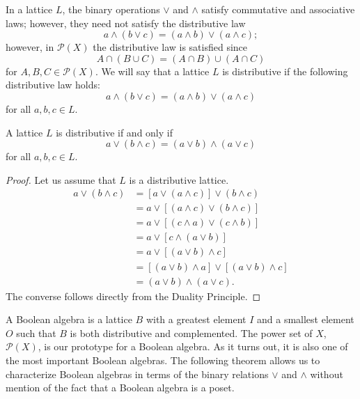  
In a lattice $L$, the binary operations $\vee$ and $\wedge$ satisfy
commutative and associative laws; however, they need not satisfy the
distributive law 
\[ 
a \wedge ( b \vee c ) = (a \wedge b ) \vee ( a \wedge c );
\] 
however, in ${\mathcal P}(X)$ the distributive law is satisfied since
\[
A \cap ( B \cup C ) = (A \cap B ) \cup ( A \cap C )
\]
for $A, B, C \in {\mathcal P}(X)$. We will say that a lattice $L$ is
{\bfi distributive\/} if the following
distributive law holds:
\[
a \wedge ( b \vee c ) = (a \wedge b ) \vee ( a \wedge c )
\]
for all $a, b, c \in L$.
 
 
\begin{theorem}\label{boolean:dist_lattice_theorem}
A lattice $L$ is distributive if and only if 
\[
a \vee ( b \wedge c ) = ( a \vee b ) \wedge ( a \vee c )
\]
for all $a, b, c \in L$.
\end{theorem}
 
 
\begin{proof}
Let us assume that $L$ is a distributive lattice.
\begin{align*}
a \vee ( b \wedge c ) 
& = [a \vee (a \wedge c) ] \vee ( b \wedge c ) \\
& = a \vee [(a \wedge c)  \vee ( b \wedge c )] \\
& = a \vee [(c \wedge a)  \vee ( c \wedge b )] \\
& = a \vee [c \wedge ( a  \vee b )] \\
& = a \vee [( a  \vee b ) \wedge c ] \\
& = [( a  \vee b ) \wedge a ] \vee [(a \vee b) \wedge c ] \\
& = ( a \vee b ) \wedge ( a \vee c ).
\end{align*}
The converse follows directly from the Duality Principle.
\end{proof}
 
 
\medskip
 
 
A {\bfi Boolean algebra\/} is a
lattice $B$ with a greatest element $I$ and a smallest element $O$
such that $B$ is both distributive and complemented. The power set of
$X$, ${\mathcal P}(X)$, is our prototype for a Boolean algebra.  As it
turns out, it is also one of the most important Boolean algebras. The
following theorem allows us to characterize Boolean algebras in terms
of the binary relations $\vee$ and $\wedge$ without mention of the
fact that a Boolean algebra is a poset. 
 
